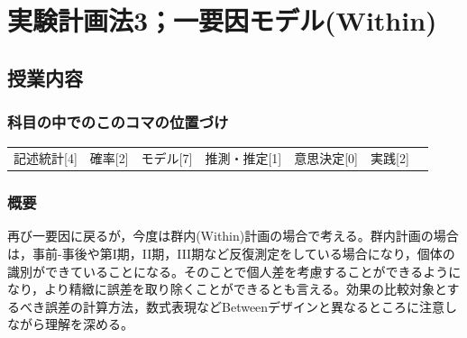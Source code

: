 \section{実験計画法3；一要因モデル(Within)}
\label{lesson14}

\subsection{授業内容}
\subsubsection{科目の中でのこのコマの位置づけ}
\begin{tabular}[t]{ccccccc}
    記述統計[4] & 確率[2] & モデル[7] & 推測・推定[1] & 意思決定[0] & 実践[2]
\end{tabular}
\subsubsection{概要}
再び一要因に戻るが，今度は群内(Within)計画の場合で考える。群内計画の場合は，事前-事後や第I期，II期，III期など反復測定をしている場合になり，個体の識別ができていることになる。そのことで個人差を考慮することができるようになり，より精緻に誤差を取り除くことができるとも言える。効果の比較対象とするべき誤差の計算方法，数式表現などBetweenデザインと異なるところに注意しながら理解を深める。
